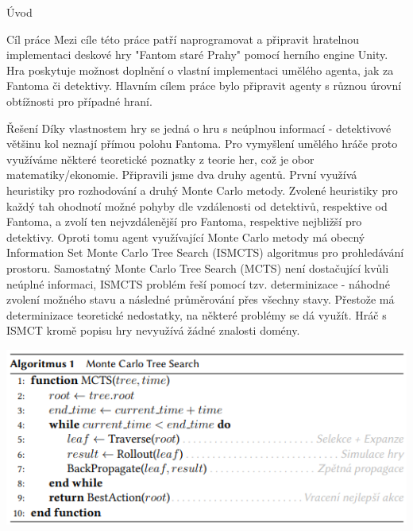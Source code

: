 \documentclass[portrait,a0paper,fontscale=0.25]{baposter}
\begin{document}
\begin{poster}
\begin{posterbox}[column=0,name=background]{Úvod}
\end{posterbox}

\begin{posterbox}[column=0, name=goals, below=background]{Cíl práce}
Mezi cíle této práce patří naprogramovat a připravit hratelnou implementaci deskové hry "Fantom staré Prahy" pomocí herního engine Unity. Hra poskytuje možnost doplnění o vlastní implementaci umělého agenta, jak za Fantoma či detektivy. Hlavním cílem práce bylo připravit agenty s různou úrovní obtížnosti pro případné hraní. 

\end{posterbox}

\begin{posterbox}[column=0, name=something1, below=goals]{Řešení}
Díky vlastnostem hry se jedná o hru s neúplnou informací - detektivové většinu kol neznají přímou polohu Fantoma. Pro vymyšlení umělého hráče proto využíváme některé teoretické poznatky z teorie her, což je obor matematiky/ekonomie. 
Připravili jsme dva druhy agentů. První využívá heuristiky pro rozhodování a druhý Monte Carlo metody. Zvolené heuristiky pro každý tah ohodnotí možné pohyby dle vzdálenosti od detektivů, respektive od Fantoma, a zvolí ten nejvzdálenější pro Fantoma, respektive nejbližší pro detektivy. Oproti tomu agent využívající Monte Carlo metody má obecný Information Set Monte Carlo Tree Search (ISMCTS) algoritmus pro prohledávání prostoru. Samostatný Monte Carlo Tree Search (MCTS) není dostačující kvůli neúplné informaci, ISMCTS problém řeší pomocí tzv. determinizace - náhodné zvolení možného stavu a následné průměrování přes všechny stavy. Přestože má determinizace teoretické nedostatky, na některé problémy se dá využít. Hráč s ISMCT kromě popisu hry nevyužívá žádné znalosti domény.

\begin{center}
\includegraphics[width=1\linewidth]{img/mcts-alg.png}
\end{center}



\end{posterbox}
\end{poster}
\end{document}
